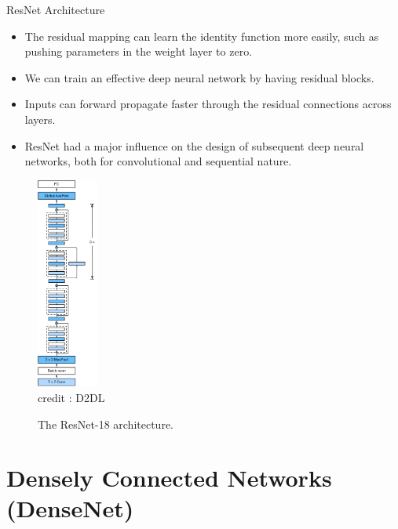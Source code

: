   \framebreak


\begin{vbframe}{ResNet Architecture}
    \begin{itemize}
        \item The residual mapping can learn the identity function more easily, such as pushing parameters in the weight layer to zero.
        \item We can train an effective deep neural network by having residual blocks.
        \item Inputs can forward propagate faster through the residual connections across layers.
        \item ResNet had a major influence on the design of subsequent deep neural networks, both for convolutional and sequential nature.
    \end{itemize}
    
     \begin{figure}
  \centering
    \includegraphics[width=2cm]{plots/moderncnn/resnet18.png}
    \tiny{\\ credit : D2DL}
    \caption{The ResNet-18 architecture.}
  \end{figure}
  
 \end{vbframe}

\section{Densely Connected Networks (DenseNet)}

